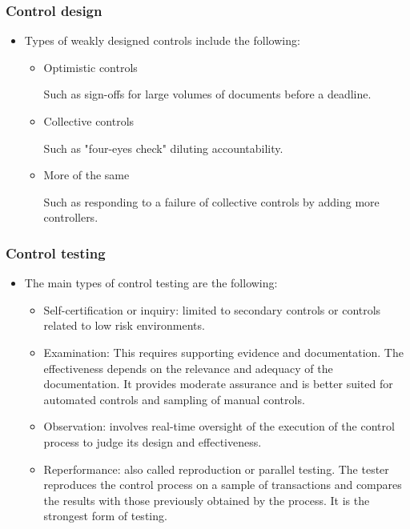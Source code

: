 \subsubsection{Control design}
\begin{itemize}
\item Types of weakly designed controls include the following:
    \begin{itemize}
    \item  Optimistic controls
    
    Such as sign-offs for large volumes of documents before  a deadline.
    \item  Collective controls
    
    Such as "four-eyes check" diluting accountability.
    \item  More of the same
    
    Such as responding to a failure of collective controls by
    adding more controllers.
    \end{itemize}
\end{itemize}


\subsubsection{Control testing}
\begin{itemize}
\item The main types of control testing are the following:
    \begin{itemize}
    \item Self-certification or inquiry: limited to secondary controls or controls related to low risk environments.
    \item  Examination: This requires supporting evidence and documentation. The effectiveness depends on the relevance and adequacy of the documentation. It provides moderate assurance and is better suited for automated controls and sampling of manual controls.
    \item Observation: involves real-time oversight of the execution of the control process to judge its design and effectiveness.
    \item  Reperformance: also called reproduction or parallel testing. The tester reproduces the control process on a sample of transactions and compares the results with those previously obtained by the process. It is the strongest form of testing.
    \end{itemize}
\end{itemize}


